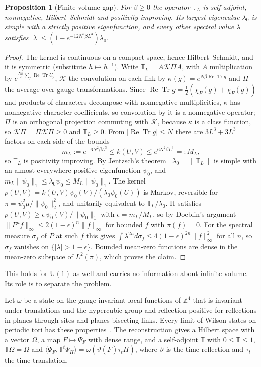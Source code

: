 \documentclass[11pt]{amsart}
\newtheorem{proposition}[theorem]{Proposition}
\theoremstyle{definition}
\theoremstyle{remark}
\newcommand{\Z}{\mathbb{Z}}
\newcommand{\U}{\mathrm{U}}
\newcommand{\ReTr}{\operatorname{Re}\operatorname{Tr}}
\newcommand{\ip}[2]{\langle #1,#2\rangle}
\begin{document}
\begin{proposition}[Finite-volume gap]\label{prop:finitegap}
For $\beta\ge0$ the operator $\mathbb T_L$ is self-adjoint, nonnegative,
Hilbert--Schmidt and positivity improving. Its largest eigenvalue $\lambda_0$
is simple with a strictly positive eigenfunction, and every other spectral
value $\lambda$ satisfies $|\lambda|\le(1-e^{-12N^2\beta L^3})\lambda_0$.
\end{proposition}

\begin{proof}
The kernel is continuous on a compact space, hence Hilbert--Schmidt, and it is
symmetric (substitute $h\mapsto h^{-1}$). Write $\mathbb T_L=A\mathcal K\Pi A$,
with $A$ multiplication by $e^{\frac{N\beta}2\sum_p\ReTr U_p}$, $\mathcal K$ the
convolution on each link by $\kappa(g)=e^{N\beta\ReTr g}$ and $\Pi$ the average
over gauge transformations. Since $\ReTr g=\frac12(\chi_F(g)+\overline{\chi_F(g)})$
and products of characters decompose with nonnegative multiplicities, $\kappa$
has nonnegative character coefficients, so convolution by it is a nonnegative
operator; $\Pi$ is an orthogonal projection commuting with $\mathcal K$, because
$\kappa$ is a class function, so $\mathcal K\Pi=\Pi\mathcal K\Pi\ge0$ and
$\mathbb T_L\ge0$. From $|\ReTr g|\le N$ there are $3L^3+3L^3$ factors on each
side of the bounds
\[
m_L:=e^{-6N^2\beta L^3}\le k(U,V)\le e^{6N^2\beta L^3}=:M_L,
\]
so $\mathbb T_L$ is positivity improving. By Jentzsch's theorem~\cite{Jen12}
$\lambda_0=\|\mathbb T_L\|$ is simple with an almost everywhere positive
eigenfunction $\psi_0$, and $m_L\|\psi_0\|_1\le\lambda_0\psi_0\le M_L\|\psi_0\|_1$.
The kernel $p(U,V)=k(U,V)\psi_0(V)/(\lambda_0\psi_0(U))$ is Markov, reversible for
$\pi=\psi_0^2\mu/\|\psi_0\|_2^2$, and unitarily equivalent to $\mathbb T_L/
\lambda_0$. It satisfies $p(U,V)\ge\epsilon\,\psi_0(V)/\|\psi_0\|_1$ with
$\epsilon=m_L/M_L$, so by Doeblin's argument $\|P^nf\|_\infty\le2(1-\epsilon)^n
\|f\|_\infty$ for bounded $f$ with $\pi(f)=0$. For the spectral measure
$\sigma_f$ of $P$ at such $f$ this gives $\int\lambda^{2n}d\sigma_f\le
4(1-\epsilon)^{2n}\|f\|_\infty^2$ for all $n$, so $\sigma_f$ vanishes on
$\{|\lambda|>1-\epsilon\}$. Bounded mean-zero functions are dense in the
mean-zero subspace of $L^2(\pi)$, which proves the claim.
\end{proof}

This holds for $\U(1)$ as well and carries no information about infinite
volume. Its role is to separate the problem.

Let $\omega$ be a state on the gauge-invariant local functions of $\Z^4$
that is invariant under translations and the hypercubic group and reflection
positive for reflections in planes through sites and planes bisecting links.
Every limit of Wilson states on periodic tori has these
properties~\cite{OSei78}. The reconstruction gives a Hilbert space with a vector
$\Omega$, a map $F\mapsto\Psi_F$ with dense range, and a self-adjoint $\mathbb T$
with $0\le\mathbb T\le1$, $\mathbb T\Omega=\Omega$ and $\ip{\Psi_F}{\mathbb T^t
\Psi_H}=\omega(\vartheta(\bar F)\tau_tH)$, where $\vartheta$ is the time
reflection and $\tau_t$ the time translation.
\end{document}

